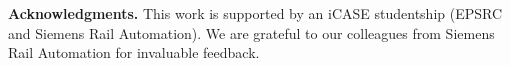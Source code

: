 \documentclass{llncs}
\begin{document}
























\noindent \textbf{Acknowledgments.} This work is supported by an iCASE studentship (EPSRC and Siemens Rail Automation). We are grateful to our colleagues from Siemens Rail Automation for invaluable feedback.




\end{document}

